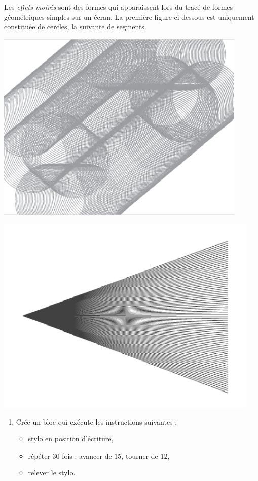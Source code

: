\documentclass[class=report,crop=false, 12pt]{standalone}
\begin{document}
\begin{activite}

Les \emph{effets moirés} sont des formes qui apparaissent lors du tracé  de formes géométriques simples sur un écran. La première figure ci-dessous est uniquement constituée de cercles, la suivante de segments.

\begin{center}
  \includegraphics[width=0.9\textwidth]{ecran-11-ex2a} 
\end{center}
\begin{center}  
  \includegraphics[width=0.95\textwidth]{ecran-11-ex2b}   
\end{center}

\begin{enumerate}
  \item Crée un bloc  qui exécute les instructions suivantes :
    \begin{itemize}
      \item stylo en position d'écriture,
      \item répéter $30$ fois : avancer de $15$, tourner de $12$\textdegree,
      \item relever le stylo.
    \end{itemize}  


\end{enumerate}
\end{activite}
\end{document}
